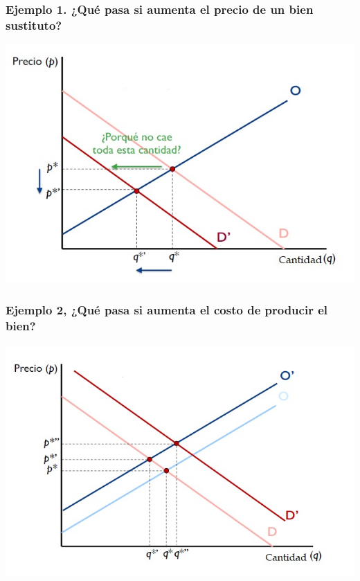 \documentclass{beamer}
\begin{document}
\begin{frame}
\frametitle{Ejemplo 1. ¿Qué pasa si aumenta el precio de un bien sustituto?}
\centering
\includegraphics[scale=0.6]{../Figures/Tema_07.4_equilibrioofertademanda.jpg}
\end{frame}

\begin{frame}
\frametitle{Ejemplo 2, ¿Qué pasa si aumenta el costo de producir el bien?}
\centering
\includegraphics[scale=0.55]{../Figures/Tema_07.5_equilibrioofertademanda2.jpg}
\end{frame}

\end{document}
